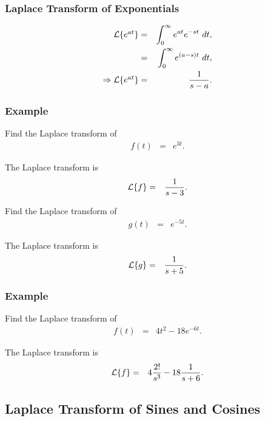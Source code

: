 \begin{frame}
  \frametitle{Laplace Transform of Exponentials}

  \begin{eqnarray*}
    \laplace{e^{at}} & = & \int^\infty_0 e^{at} e^{-st} ~ dt, \\
    & = & \int^\infty_0 e^{(a-s)t} ~ dt, \\
    \Rightarrow \laplace{e^{at}} & = & \frac{1}{s-a}.
  \end{eqnarray*}

\end{frame}


\begin{frame}
  \frametitle{Example}

  Find the Laplace transform of 
  \begin{eqnarray*}
    f(t) & = & e^{3t}.
  \end{eqnarray*}

  The Laplace transform is
  \begin{eqnarray*}
    \laplace{f} & = & \frac{1}{s-3}.
  \end{eqnarray*}

  {
    Find the Laplace transform of 
    \begin{eqnarray*}
      g(t) & = & e^{-5t}.
    \end{eqnarray*}

    The Laplace transform is
    \begin{eqnarray*}
      \laplace{g} & = & \frac{1}{s+5}.
    \end{eqnarray*}
  }


\end{frame}


\begin{frame}
  \frametitle{Example}

  Find the Laplace transform of 
  \begin{eqnarray*}
    f(t) & = & 4t^2 - 18 e^{-6t}.
  \end{eqnarray*}

  The Laplace transform is
  \begin{eqnarray*}
    \laplace{f} & = & 4 \frac{2!}{s^3} - 18 \frac{1}{s+6}.
  \end{eqnarray*}

\end{frame}


\subsection{Laplace Transform of Sines and Cosines}

